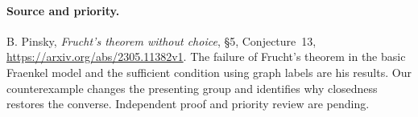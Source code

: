 \documentclass[11pt]{article}
\begin{document}
\paragraph{Source and priority.} B. Pinsky, \emph{Frucht's theorem without choice}, §5, Conjecture~13, \url{https://arxiv.org/abs/2305.11382v1}. The failure of Frucht's theorem in the basic Fraenkel model and the sufficient condition using graph labels are his results. Our counterexample changes the presenting group and identifies why closedness restores the converse. Independent proof and priority review are pending.
\end{document}
